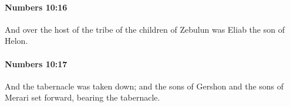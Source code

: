 		\paragraph{Numbers 10:16} %
			\label{NUMBERS-10-16}

			And over the host of the tribe of the children of Zebulun was Eliab the son of Helon.


		\paragraph{Numbers 10:17} %
			\label{NUMBERS-10-17}

			And the tabernacle was taken down; and the sons of Gershon and the sons of Merari set forward, bearing the tabernacle.


